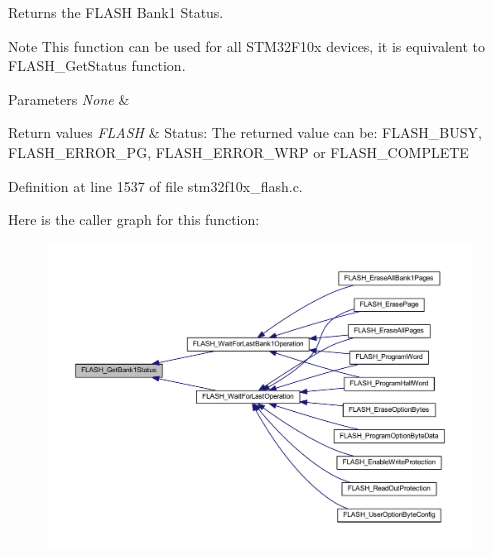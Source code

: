 Returns the F\+L\+A\+SH Bank1 Status. 

\begin{DoxyNote}{Note}
This function can be used for all S\+T\+M32\+F10x devices, it is equivalent to F\+L\+A\+S\+H\+\_\+\+Get\+Status function. 
\end{DoxyNote}

\begin{DoxyParams}{Parameters}
{\em None} & \\
\hline
\end{DoxyParams}

\begin{DoxyRetVals}{Return values}
{\em F\+L\+A\+SH} & Status\+: The returned value can be\+: F\+L\+A\+S\+H\+\_\+\+B\+U\+SY, F\+L\+A\+S\+H\+\_\+\+E\+R\+R\+O\+R\+\_\+\+PG, F\+L\+A\+S\+H\+\_\+\+E\+R\+R\+O\+R\+\_\+\+W\+RP or F\+L\+A\+S\+H\+\_\+\+C\+O\+M\+P\+L\+E\+TE \\
\hline
\end{DoxyRetVals}


Definition at line 1537 of file stm32f10x\+\_\+flash.\+c.

Here is the caller graph for this function\+:
\nopagebreak
\begin{figure}[H]
\begin{center}
\leavevmode
\includegraphics[width=350pt]{group___f_l_a_s_h___private___functions_ga9d5b76b75ef4c578cc45dc836a1929b6_icgraph}
\end{center}
\end{figure}
\mbox{\label{group___f_l_a_s_h___private___functions_gae3fb545e32f21501ca27d4380e0f2088}} 
